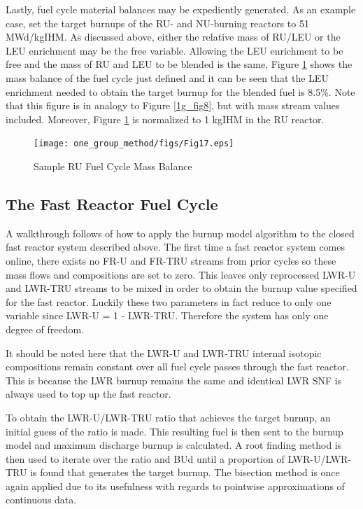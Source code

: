 Lastly, fuel cycle material balances may be expediently generated.   As an example case, set the 
target burnups of the RU- and NU-burning reactors to 51 MWd/kgIHM.  As discussed above, either the 
relative mass of RU/LEU or the LEU enrichment may be the free variable.  Allowing the LEU enrichment 
to be free and the mass of RU and LEU to be blended is the same,  Figure \ref{1g_fig17} shows the mass balance of 
the fuel cycle just defined and it can be seen that the LEU enrichment needed to obtain the 
target burnup for the blended fuel is 8.5\%.  Note that this figure is in analogy to Figure \ref{1g_fig8}, 
but with mass stream values included.  Moreover, Figure \ref{1g_fig17} is normalized to 1 kgIHM in the RU reactor.

\begin{figure}[htbp]
\caption{Sample RU Fuel Cycle Mass Balance}
\label{1g_fig17}
\begin{center}
\texttt{[image: one\_group\_method/figs/Fig17.eps]}
\end{center}
\end{figure}



\subsection{The Fast Reactor Fuel Cycle}
\label{1g_sec:FRFC}
A walkthrough follows of how to apply the burnup model algorithm to the closed fast reactor 
system described above.  The first time a fast reactor system comes online, there exists no 
FR-U and FR-TRU streams from prior cycles so these mass flows and compositions are set to zero.   
This leaves only reprocessed LWR-U and LWR-TRU streams to be mixed in order to obtain the burnup 
value specified for the fast reactor.  Luckily these two parameters in fact reduce to only one 
variable since LWR-U = 1 - LWR-TRU.  Therefore the system has only one degree of freedom.  

It should be noted here that the LWR-U and LWR-TRU internal isotopic compositions remain constant 
over all fuel cycle passes through the fast reactor.  This is because the LWR burnup remains the 
same and identical LWR SNF is always used to top up the fast reactor.  

To obtain the LWR-U/LWR-TRU ratio that achieves the target burnup, an initial guess of the ratio 
is made.  This resulting fuel is then sent to the burnup model and maximum discharge burnup is 
calculated.  A root finding method is then used to iterate over the ratio and BUd until a 
proportion of LWR-U/LWR-TRU is found that generates the target burnup.  The bisection method 
is once again applied due to its usefulness with regards to pointwise approximations of continuous data.

